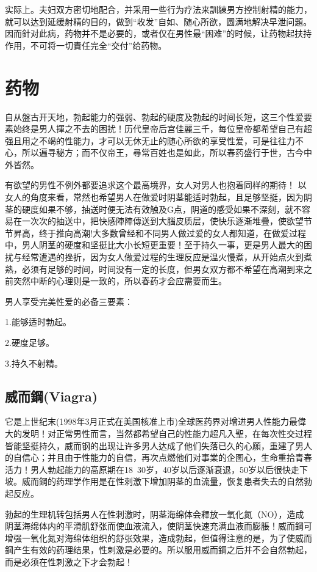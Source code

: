 \documentclass[12pt,UTF8]{ctexbook}
\begin{document}
实际上。夫妇双方密切地配合，并采用一些行为疗法来訓練男方控制射精的能力，就可以达到延缓射精的目的，做到“收发”自如、随心所欲，圆满地解决早泄问題。因而針对此病，药物并不是必要的，或者仅在男性最“困难”的时候，让药物起扶持作用，不可将一切責任完全“交付”给药物。

\chapter{药物}

自从盤古开天地，勃起能力的强弱、勃起的硬度及勃起的时间长短，这三个性爱要素始终是男人揮之不去的困扰！历代皇帝后宫佳麗三千，每位皇帝都希望自己有超强且用之不竭的性能力，才可以无休无止的随心所欲的享受性爱，可是往往力不心，所以遍寻秘方；而不仅帝王，尋常百姓也是如此，所以春药盛行于世，古今中外皆然。

有欲望的男性不例外都要追求这个最高境界，女人对男人也抱着同样的期待！
以女人的角度来看，常然也希望男人在做爱时阴茎能适时勃起，且足够坚挺，因为阴茎的硬度如果不够，抽送时便无法有效触及G点，阴道的感受如果不深刻，就不容易在一次次的抽送中，把快感陣陣傳送到大腦皮质层，使快乐逐渐堆疊，使欲望节节昇高，终于推向高潮!大多数曾经和不同男人做过爱的女人都知道，在做爱过程中，男人阴茎的硬度和坚挺比大小长短更重要！至于持久一事，更是男人最大的困扰与经常遭遇的挫折，因为女人做爱过程的生理反应是温火慢煮，从开始点火到煮熟，必须有足够的时间，时间没有一定的长度，但男女双方都不希望在高潮到来之前突然中断的心理则是一致的，所以春药才会应需要而生。

男人享受完美性爱的必备三要素：

1.能够适时勃起。

2.硬度足够。

3.持久不射精。

\section{威而鋼(Viagra)}

它是上世纪末(1998年3月正式在美国核准上市)全球医药界对增进男人性能力最偉大的发明！对正常男性而言，当然都希望自己的性能力超凡入聖，在每次性交过程皆能坚挺持久，威而钢的出现让许多男人达成了他们失落已久的心願，重建了男人的自信心；并且由于性能力的自信，再次点燃他们对事業的企图心，生命重拾青春活力！男人勃起能力的高原期在18~30岁，40岁以后逐渐衰退，50岁以后很快走下坡。威而鋼的药理学作用是在性刺激下增加阴茎的血流量，恢复患者失去的自然勃起反应。

勃起的生理机转包括男人在性刺激时，阴茎海绵体会釋放一氧化氮（NO），造成阴茎海绵体内的平滑肌舒张而使血液流入，使阴茎快速充满血液而膨脹！威而鋼可增强一氧化氮对海绵体组织的舒张效果，造成勃起，但值得注意的是，为了使威而鋼产生有效的药理结果，性刺激是必要的。所以服用威而鋼之后并不会自然勃起，而是必须在性刺激之下才会勃起！
\end{document}
